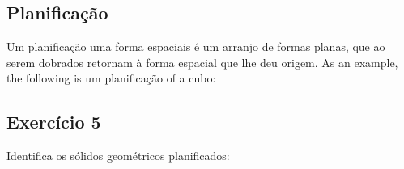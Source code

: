 \subsection*{Planificação}

Um planificação uma forma espaciais é um arranjo de formas planas, que ao serem
dobrados retornam à forma espacial que lhe deu origem. As an example,
the following is um planificação of a cubo:

\begin{center}
\end{center}

\subsection*{Exercício 5}

Identifica os sólidos geométricos planificados:

